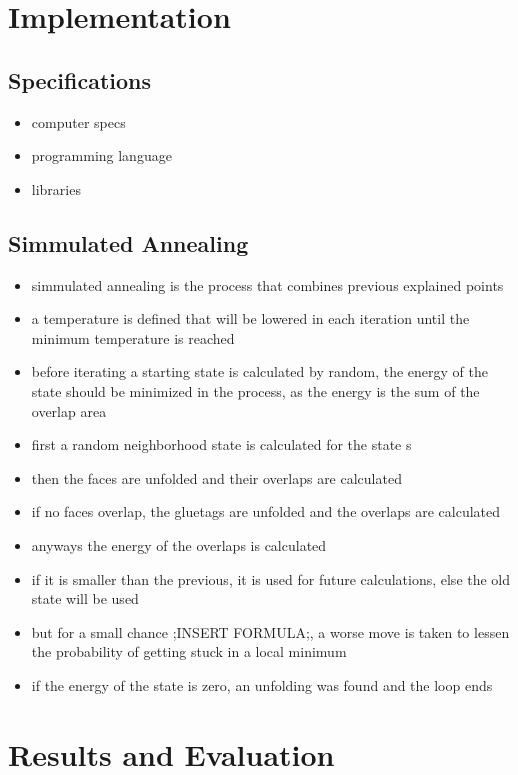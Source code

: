 \documentclass[draft,final]{vutinfth} %
\begin{document}
\chapter{Implementation}

\section{Specifications}

\begin{itemize}
	\item computer specs
	\item programming language
	\item libraries
\end{itemize}

\section{Simmulated Annealing}

\begin{itemize}
	\item simmulated annealing is the process that combines previous explained points
	\item a temperature is defined that will be lowered in each iteration until the minimum temperature is reached
	\item before iterating a starting state is calculated by random, the energy of the state should be minimized in the process, as the energy is the sum of the overlap area
	\item first a random neighborhood state is calculated for the state s
	\item then the faces are unfolded and their overlaps are calculated
	\item if no faces overlap, the gluetags are unfolded and the overlaps are calculated
	\item anyways the energy of the overlaps is calculated	
	\item if it is smaller than the previous, it is used for future calculations, else the old state will be used
	\item but for a small chance ;INSERT FORMULA;, a worse move is taken to lessen the probability of getting stuck in a local minimum
	\item if the energy of the state is zero, an unfolding was found and the loop ends
\end{itemize}

\chapter{Results and Evaluation}
\end{document}
